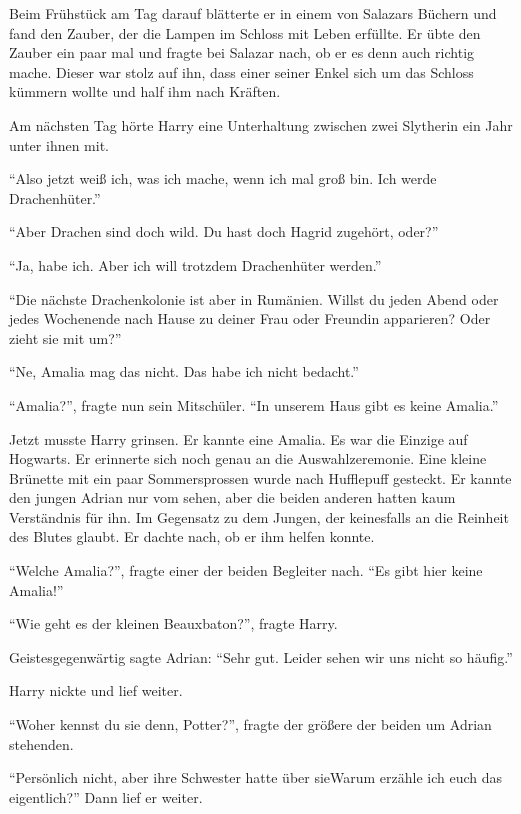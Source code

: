 
Beim Frühstück am Tag darauf blätterte er in einem von Salazars Büchern und fand den Zauber, der die Lampen im Schloss mit Leben erfüllte. Er übte den Zauber ein paar mal und fragte bei Salazar nach, ob er es denn auch richtig mache. Dieser war stolz auf ihn, dass einer seiner Enkel sich um das Schloss kümmern wollte und half ihm nach Kräften.

Am nächsten Tag hörte Harry eine Unterhaltung zwischen zwei Slytherin ein Jahr unter ihnen mit.

\enquote{Also jetzt weiß ich, was ich mache, wenn ich mal groß bin. Ich werde Drachenhüter.}

\enquote{Aber Drachen sind doch wild. Du hast doch Hagrid zugehört, oder?}

\enquote{Ja, habe ich. Aber ich will trotzdem Drachenhüter werden.}

\enquote{Die nächste Drachenkolonie ist aber in Rumänien. Willst du jeden Abend oder jedes Wochenende nach Hause zu deiner Frau oder Freundin apparieren? Oder zieht sie mit um?}

\enquote{Ne, Amalia mag das nicht. Das habe ich nicht bedacht.}

\enquote{Amalia?}, fragte nun sein Mitschüler. \enquote{In unserem Haus gibt es keine Amalia.}

Jetzt musste Harry grinsen. Er kannte eine Amalia. Es war die Einzige auf Hogwarts. Er erinnerte sich noch genau an die Auswahlzeremonie. Eine kleine Brünette mit ein paar Sommersprossen wurde nach Hufflepuff gesteckt. Er kannte den jungen Adrian nur vom sehen, aber die beiden anderen hatten kaum Verständnis für ihn. Im Gegensatz zu dem Jungen, der keinesfalls an die Reinheit des Blutes glaubt. Er dachte nach, ob er ihm helfen konnte.

\enquote{Welche Amalia?}, fragte einer der beiden Begleiter nach. \enquote{Es gibt hier keine Amalia!}

\enquote{Wie geht es der kleinen Beauxbaton?}, fragte Harry.

Geistesgegenwärtig sagte Adrian: \enquote{Sehr gut. Leider sehen wir uns nicht so häufig.}

Harry nickte und lief weiter.

\enquote{Woher kennst du sie denn, Potter?}, fragte der größere der beiden um Adrian stehenden.

\enquote{Persönlich nicht, aber ihre Schwester hatte über sie\abs Warum erzähle ich euch das eigentlich?} Dann lief er weiter.


